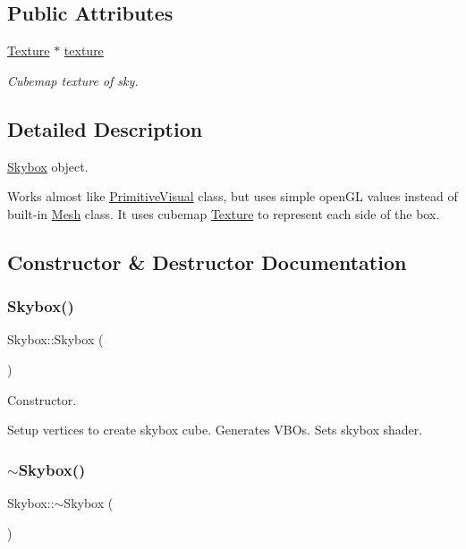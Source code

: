 \subsection*{Public Attributes}
\begin{DoxyCompactItemize}
\item 
\mbox{\hyperlink{class_texture}{Texture}} $\ast$ \mbox{\hyperlink{class_skybox_a6e1ace9b3bcf2c50136a833d2a1d2118}{texture}}
\begin{DoxyCompactList}\small\item\em Cubemap texture of sky. \end{DoxyCompactList}\end{DoxyCompactItemize}


\subsection{Detailed Description}
\mbox{\hyperlink{class_skybox}{Skybox}} object. 

Works almost like \mbox{\hyperlink{class_primitive_visual}{Primitive\+Visual}} class, but uses simple open\+GL values instead of built-\/in \mbox{\hyperlink{class_mesh}{Mesh}} class. It uses cubemap \mbox{\hyperlink{class_texture}{Texture}} to represent each side of the box. 

\subsection{Constructor \& Destructor Documentation}
\mbox{\label{class_skybox_a77a92db4492ed94ed4bd101b05ffb1f4}} 
\subsubsection{\texorpdfstring{Skybox()}{Skybox()}}
{\footnotesize\ttfamily Skybox\+::\+Skybox (\begin{DoxyParamCaption}{ }\end{DoxyParamCaption})}



Constructor. 

Setup vertices to create skybox cube. Generates V\+B\+Os. Sets skybox shader. \mbox{\label{class_skybox_a62ad4c6b4b1965a0a6d8536a50d4c090}} 
\subsubsection{\texorpdfstring{$\sim$Skybox()}{~Skybox()}}
{\footnotesize\ttfamily Skybox\+::$\sim$\+Skybox (\begin{DoxyParamCaption}{ }\end{DoxyParamCaption})}



